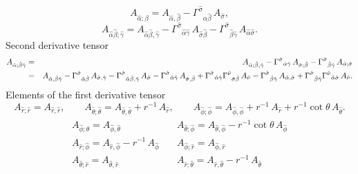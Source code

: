 \documentclass[\mydriver,12pt,twoside,notitlepage,a4paper]{article}
\begin{document}
\begin{equation}
A_{\hat\alpha;\hat\beta}=A_{\hat\alpha,\hat\beta}
-{\Gamma^{\hat\sigma}}_{\hat\alpha\hat\beta}\,A_{\hat\sigma},
\end{equation}
\begin{equation}
A_{\hat\alpha\hat\beta;\hat\gamma}=A_{\hat\alpha\hat\beta,\hat\gamma}
-{\Gamma^{\hat\sigma}}_{\hat\alpha\hat\gamma}\,A_{\hat\sigma\hat\beta}
-{\Gamma^{\hat\sigma}}_{\hat\beta\hat\gamma}\,A_{\hat\alpha\hat\sigma}.
\end{equation}
Second derivative tensor
\begin{eqnarray}
A_{\hat\alpha;\hat\beta\hat\gamma}
&=&A_{\hat\alpha;\hat\beta,\hat\gamma}
-{\Gamma^{\hat\sigma}}_{\hat\alpha\hat\gamma}\,A_{\hat\sigma;\hat\beta}
-{\Gamma^{\hat\sigma}}_{\hat\beta\hat\gamma}\,A_{\hat\alpha;\hat\sigma}
\cr
&=&A_{\hat\alpha,\hat\beta\hat\gamma}
-{\Gamma^{\hat\sigma}}_{\hat\alpha\hat\beta}\,A_{\hat\sigma,\hat\gamma}
-{\Gamma^{\hat\sigma}}_{\hat\alpha\hat\beta,\hat\gamma}\,A_{\hat\sigma}
-{\Gamma^{\hat\sigma}}_{\hat\alpha\hat\gamma}\,A_{\hat\sigma,\hat\beta}
+{\Gamma^{\hat\sigma}}_{\hat\alpha\hat\gamma}{\Gamma^{\hat\nu}}_{\hat\sigma\hat\beta}\,A_{\hat\nu}
-{\Gamma^{\hat\sigma}}_{\hat\beta\hat\gamma}\,A_{\hat\alpha,\hat\sigma}
+{\Gamma^{\hat\sigma}}_{\hat\beta\hat\gamma}{\Gamma^{\hat\nu}}_{\hat\alpha\hat\sigma}\,A_{\hat\nu}.
\nonumber
\end{eqnarray}
Elements of the first derivative tensor
\begin{equation}
A_{\hat r;\hat r}=A_{\hat r,\hat r},
\quad\quad
A_{\hat\theta;\hat\theta}=A_{\hat\theta,\hat\theta}
+r^{-1}\,A_{\hat r},
\quad\quad
A_{\hat\phi;\hat\phi}=A_{\hat\phi,\hat\phi}
+r^{-1}\,A_{\hat r}
+r^{-1}\!\cot\!\theta\,A_{\hat\theta}.
\label{DiagonalElements}
\end{equation}
\begin{eqnarray}
\begin{array}{lll}
A_{\hat\phi;\hat\theta}=A_{\hat\phi,\hat\theta}
\quad&
A_{\hat\theta;\hat\phi}=A_{\hat\theta,\hat\phi}
-r^{-1}\!\cot\!\theta\,A_{\hat\phi}
\\
A_{\hat r;\hat\phi}=A_{\hat r,\hat\phi}
-r^{-1}\,A_{\hat\phi}
\quad&
A_{\hat\phi;\hat r}=A_{\hat\phi,\hat r}
\\
A_{\hat\theta;\hat r}=A_{\hat\theta,\hat r}
\quad&
A_{\hat r;\hat\theta}=A_{\hat r,\hat\theta}
-r^{-1}\,A_{\hat\theta}
\end{array}
\label{OffDiagonalElements}
\end{eqnarray}
\end{document}
